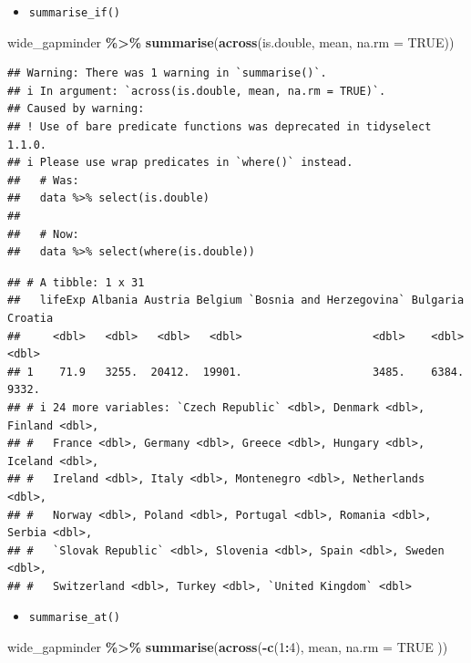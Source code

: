 \documentclass[
]{book}
\newenvironment{Shaded}{\begin{snugshade}}{\end{snugshade}}
\newcommand{\AttributeTok}[1]{\textcolor[rgb]{0.13,0.29,0.53}{#1}}
\newcommand{\ConstantTok}[1]{\textcolor[rgb]{0.56,0.35,0.01}{#1}}
\newcommand{\DecValTok}[1]{\textcolor[rgb]{0.00,0.00,0.81}{#1}}
\newcommand{\FunctionTok}[1]{\textcolor[rgb]{0.13,0.29,0.53}{\textbf{#1}}}
\newcommand{\NormalTok}[1]{#1}
\newcommand{\SpecialCharTok}[1]{\textcolor[rgb]{0.81,0.36,0.00}{\textbf{#1}}}
\providecommand{\tightlist}{%
  \setlength{\itemsep}{0pt}\setlength{\parskip}{0pt}}
\begin{document}
\begin{itemize}
\tightlist
\item
  \texttt{summarise\_if()}
\end{itemize}

\begin{Shaded}
\begin{Highlighting}[]
\NormalTok{wide\_gapminder }\SpecialCharTok{\%\textgreater{}\%}
  \FunctionTok{summarise}\NormalTok{(}\FunctionTok{across}\NormalTok{(is.double, mean, }\AttributeTok{na.rm =} \ConstantTok{TRUE}\NormalTok{))}
\end{Highlighting}
\end{Shaded}

\begin{verbatim}
## Warning: There was 1 warning in `summarise()`.
## i In argument: `across(is.double, mean, na.rm = TRUE)`.
## Caused by warning:
## ! Use of bare predicate functions was deprecated in tidyselect 1.1.0.
## i Please use wrap predicates in `where()` instead.
##   # Was:
##   data %>% select(is.double)
## 
##   # Now:
##   data %>% select(where(is.double))
\end{verbatim}

\begin{verbatim}
## # A tibble: 1 x 31
##   lifeExp Albania Austria Belgium `Bosnia and Herzegovina` Bulgaria Croatia
##     <dbl>   <dbl>   <dbl>   <dbl>                    <dbl>    <dbl>   <dbl>
## 1    71.9   3255.  20412.  19901.                    3485.    6384.   9332.
## # i 24 more variables: `Czech Republic` <dbl>, Denmark <dbl>, Finland <dbl>,
## #   France <dbl>, Germany <dbl>, Greece <dbl>, Hungary <dbl>, Iceland <dbl>,
## #   Ireland <dbl>, Italy <dbl>, Montenegro <dbl>, Netherlands <dbl>,
## #   Norway <dbl>, Poland <dbl>, Portugal <dbl>, Romania <dbl>, Serbia <dbl>,
## #   `Slovak Republic` <dbl>, Slovenia <dbl>, Spain <dbl>, Sweden <dbl>,
## #   Switzerland <dbl>, Turkey <dbl>, `United Kingdom` <dbl>
\end{verbatim}

\begin{itemize}
\tightlist
\item
  \texttt{summarise\_at()}
\end{itemize}

\begin{Shaded}
\begin{Highlighting}[]
\NormalTok{wide\_gapminder }\SpecialCharTok{\%\textgreater{}\%}
  \FunctionTok{summarise}\NormalTok{(}\FunctionTok{across}\NormalTok{(}\SpecialCharTok{{-}}\FunctionTok{c}\NormalTok{(}\DecValTok{1}\SpecialCharTok{:}\DecValTok{4}\NormalTok{),}
\NormalTok{    mean,}
    \AttributeTok{na.rm =} \ConstantTok{TRUE}
\NormalTok{  ))}
\end{Highlighting}
\end{Shaded}
\end{document}
